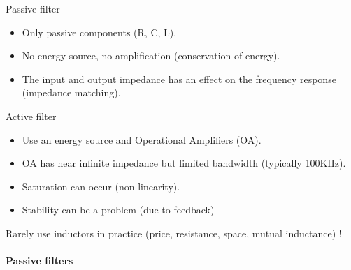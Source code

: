   \begin{block}{Passive filter}
    \begin{itemize}
    \item Only passive components (R, C, L).
    \item No energy source, no amplification (conservation of energy).
    \item The input and output impedance has an effect on the frequency response (impedance matching).
    \end{itemize}
  \end{block}

  \begin{block}{Active filter}
       \begin{itemize}
    \item Use an energy source and Operational Amplifiers (OA).
    \item OA has near infinite impedance  but limited bandwidth (typically 100KHz).
    \item Saturation can occur (non-linearity).
    \item Stability can be a problem (due to feedback)
    \end{itemize}
  \end{block}
  Rarely use inductors in practice (price, resistance, space, mutual inductance) !

\paragraph{Passive filters}

